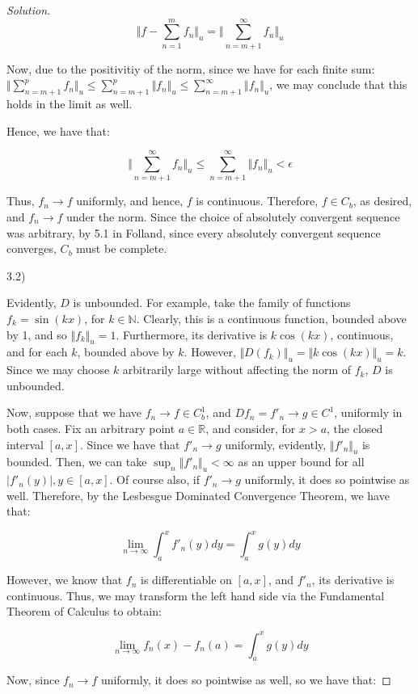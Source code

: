 \documentclass[10pt]{article}
\begin{document}
\begin{proof}[Solution]
$$ \Vert f - \sum_{n=1}^m f_n \Vert_u = \Vert \sum_{n=m+1}^\infty f_n \Vert_u$$

Now, due to the positivitiy of the norm, since we have for each finite sum: $\Vert \sum_{n=m+1}^p f_n \Vert_u \leq \sum_{n=m+1}^p \Vert f_n \Vert_u \leq \sum_{n=m+1}^\infty \Vert f_n \Vert_u$, we may conclude that this holds in the limit as well.

Hence, we have that:

$$ \Vert \sum_{n=m+1}^\infty f_n \Vert_u \leq \sum_{n=m+1}^\infty \Vert f_n \Vert_u < \epsilon $$

Thus, $f_n \to f$ uniformly, and hence, $f$ is continuous. Therefore, $f \in C_b$, as desired, and $f_n \to f$ under the norm. Since the choice of absolutely convergent sequence was arbitrary, by 5.1 in Folland, since every absolutely convergent sequence converges, $C_b$ must be complete.

3.2)

Evidently, $D$ is unbounded. For example, take the family of functions $f_k = \sin(kx)$, for $k \in \mathbb{N}$. Clearly, this is a continuous function, bounded above by 1, and so $\Vert f_k \Vert_u = 1$. Furthermore, its derivative is $k \cos(kx)$, continuous, and for each $k$, bounded above by $k$. However, $ \Vert D(f_k) \Vert_u = \Vert k \cos (kx) \Vert_u = k$. Since we may choose $k$ arbitrarily large without affecting the norm of $f_k$, $D$ is unbounded.

Now, suppose that we have $f_n \to f \in C^1_b$, and $Df_n = f'_n \to g \in C^1$, uniformly in both cases. Fix an arbitrary point $a \in \mathbb{R}$, and consider, for $x > a$, the closed interval $[a,x]$. Since we have that $f'_n \to g$ uniformly, evidently, $\Vert f'_n \Vert_u$ is bounded. Then, we can take $\sup_{n} \Vert f'_n \Vert_u < \infty$ as an upper bound for all $|f'_n(y)|, y \in [a,x]$. Of course also, if $f'_n \to g$ uniformly, it does so pointwise as well. Therefore, by the Lesbesgue Dominated Convergence Theorem, we have that:

$$ \lim_{n \to \infty} \int_a^x f'_n(y) dy = \int_a^x g(y) dy $$

However, we know that $f_n$ is differentiable on $[a,x]$, and $f'_n$, its derivative is continuous. Thus, we may transform the left hand side via the Fundamental Theorem of Calculus to obtain:

$$ \lim_{n \to \infty} f_n(x) - f_n(a) = \int_a^x g(y) dy$$

Now, since $f_n \to f$ uniformly, it does so pointwise as well, so we have that:


\end{proof}
\end{document}

